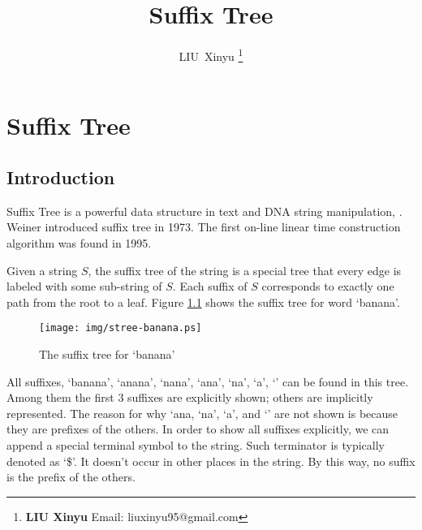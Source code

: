 \documentclass{article}
\begin{document}


\title{Suffix Tree}

\author{LIU~Xinyu
\thanks{{\bfseries LIU Xinyu } \newline
  Email: liuxinyu95@gmail.com \newline}
  }

\maketitle
\fi


\ifx\wholebook\relax
\chapter{Suffix Tree}
\fi


\section{Introduction}
\label{introduction}

Suffix Tree is a powerful data structure in text and DNA string manipulation\cite{wiki-suffix-tree},
\cite{ukkonen-presentation}. Weiner introduced suffix tree in 1973\cite{weiner73}.
The first on-line linear time construction algorithm was found in 1995\cite{ukkonen95}.

Given a string $S$, the suffix tree of the string is a special tree that
every edge is labeled with some sub-string of $S$.
Each suffix of $S$ corresponds to exactly one path
from the root to a leaf. Figure \ref{fig:stree-banana} shows the suffix tree for
word `banana'.

\begin{figure}[htbp]
  \centering
  \texttt{[image: img/stree-banana.ps]}
  \caption{The suffix tree for `banana'} \label{fig:stree-banana}
\end{figure}

All suffixes, `banana', `anana', `nana', `ana', `na', `a', `' can
be found in this tree. Among them the first 3 suffixes are explicitly
shown; others are implicitly represented. The reason for why `ana, `na', `a',
and `' are not shown is because they are prefixes of the others.
In order to show all suffixes explicitly, we can append a special
terminal symbol to the string.
Such terminator is typically
denoted as `\$'. It doesn't occur in other places in the string.
By this way, no suffix is the prefix of the others.
\end{document}
